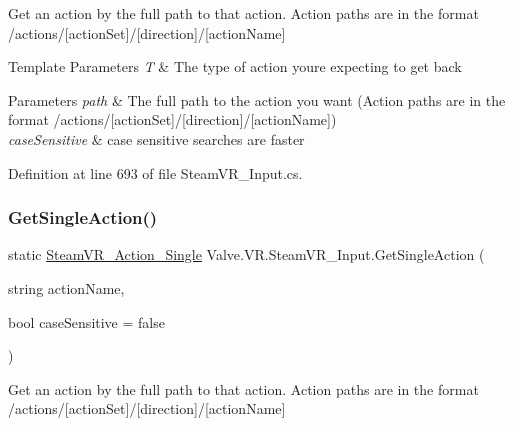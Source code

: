 Get an action by the full path to that action. Action paths are in the format /actions/\mbox{[}action\+Set\mbox{]}/\mbox{[}direction\mbox{]}/\mbox{[}action\+Name\mbox{]} 


\begin{DoxyTemplParams}{Template Parameters}
{\em T} & The type of action you\textquotesingle{}re expecting to get back\\
\hline
\end{DoxyTemplParams}

\begin{DoxyParams}{Parameters}
{\em path} & The full path to the action you want (Action paths are in the format /actions/\mbox{[}action\+Set\mbox{]}/\mbox{[}direction\mbox{]}/\mbox{[}action\+Name\mbox{]})\\
\hline
{\em case\+Sensitive} & case sensitive searches are faster\\
\hline
\end{DoxyParams}


Definition at line 693 of file Steam\+V\+R\+\_\+\+Input.\+cs.

\mbox{\label{class_valve_1_1_v_r_1_1_steam_v_r___input_afe873662970a8590722180d656847fb2}} 
\subsubsection{\texorpdfstring{GetSingleAction()}{GetSingleAction()}\hspace{0.1cm}{\footnotesize\ttfamily [2/2]}}
{\footnotesize\ttfamily static \mbox{\hyperlink{class_valve_1_1_v_r_1_1_steam_v_r___action___single}{Steam\+V\+R\+\_\+\+Action\+\_\+\+Single}} Valve.\+V\+R.\+Steam\+V\+R\+\_\+\+Input.\+Get\+Single\+Action (\begin{DoxyParamCaption}\item[{string}]{action\+Name,  }\item[{bool}]{case\+Sensitive = {\ttfamily false} }\end{DoxyParamCaption})\hspace{0.3cm}{\ttfamily [static]}}



Get an action by the full path to that action. Action paths are in the format /actions/\mbox{[}action\+Set\mbox{]}/\mbox{[}direction\mbox{]}/\mbox{[}action\+Name\mbox{]} 


